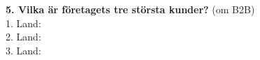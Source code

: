 \documentclass[10pt]{beamer}
\begin{document}
\begin{frame}[label=riskfragor-steg3]
  \vspace{0.3cm}

  \textbf{5. Vilka är företagets tre största kunder?} (om B2B)\\
  1. \underline{\hspace{5cm}} Land: \underline{\hspace{2cm}}\\
  2. \underline{\hspace{5cm}} Land: \underline{\hspace{2cm}}\\
  3. \underline{\hspace{5cm}} Land: \underline{\hspace{2cm}}

  \vspace{0.5cm}
  \begin{flushright}
    \hyperlink{riskfragor-steg2}{} \hspace{0.3cm} \hyperlink{riskfragor-steg4}{}
  \end{flushright}
\end{frame}
\end{document}
